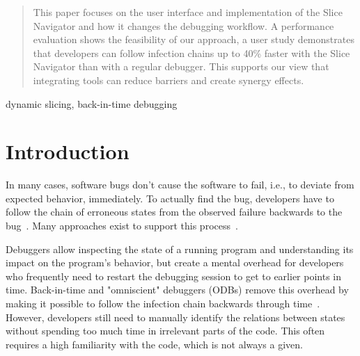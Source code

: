 \documentclass[
			english,
			]{elsarticle}
\begin{document}
\begin{frontmatter}
\begin{abstract}
This paper focuses on the user interface and implementation of the Slice Navigator and how it changes the debugging workflow. 
A performance evaluation shows the feasibility of our approach, a user study demonstrates that developers can follow infection chains up to 40\% faster with the Slice Navigator than with a regular debugger. 
This supports our view that integrating tools can reduce barriers and create synergy effects.

\end{abstract}

\begin{keyword}
dynamic slicing, back-in-time debugging
\end{keyword}

\end{frontmatter}

\linenumbers

\section{Introduction}
\label{sec:introduction}

In many cases, software bugs don't cause the software to fail, i.e., to deviate from expected behavior, immediately.
To actually find the bug, developers have to follow the chain of erroneous states from the observed failure backwards to the bug~\cite{zeller_why_2009}.
Many approaches exist to support this process~\cite{wong_survey_2016}.

Debuggers allow inspecting the state of a running program and understanding its impact on the program's behavior, but create a mental overhead for developers who frequently need to restart the debugging session to get to earlier points in time.
Back-in-time and "omniscient" debuggers (ODBs) remove this overhead by making it possible to follow the infection chain backwards through time~\cite{lewis_debugging_2003}.
However, developers still need to manually identify the relations between states without spending too much time in irrelevant parts of the code.
This often requires a high familiarity with the code, which is not always a given.
%
\end{document}
